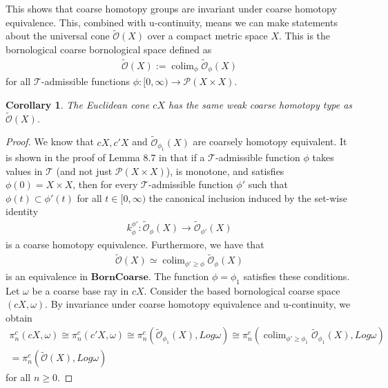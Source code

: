 \documentclass[a4paper,11pt]{article}
\theoremstyle{definition}
\theoremstyle{plain}
\newtheorem{cor}[definition]{Corollary}
\theoremstyle{remark}
\DeclareMathOperator{\colim}{colim}
\begin{document}
This shows that coarse homotopy groups are invariant under coarse homotopy equivalence. This, combined with u-continuity, means we can make statements about the universal cone $\tilde{\mathcal{O}}(X)$ over a compact metric space $X$. This is the bornological coarse bornological space defined as 
\begin{align*}
\tilde{\mathcal{O}}(X):= \colim_{\phi} \tilde{\mathcal{O}}_{\phi}(X)
\end{align*}
for all $\mathcal{T}$-admissible functions $\phi: [0,\infty) \rightarrow \mathcal{P}(X\times X)$.\\

\begin{cor} The Euclidean cone $cX$ has the same weak coarse homotopy type as $\tilde{\mathcal{O}}(X)$. 
\end{cor}

\begin{proof} We know that $cX,c'X$ and $\tilde{\mathcal{O}}_{\phi_1}(X)$ are coarsely homotopy equivalent. It is shown in the proof of Lemma $8.7$ in \cite{bunke2020coarse}  that if a $\mathcal{T}$-admissible function $\phi$ takes values in $\mathcal{T}$ (and not just $\mathcal{P}(X\times X)$), is monotone, and satisfies $\phi(0) = X \times X$, then for every $\mathcal{T}$-admissible function $\phi'$ such that $\phi(t) \subset \phi'(t)$ for all $t\in [0,\infty)$ the canonical inclusion induced by the set-wise identity 
\begin{align*}
k^{\phi'}_{\phi} : \tilde{\mathcal{O}}_{\phi}(X) \rightarrow \tilde{\mathcal{O}}_{\phi'}(X)
\end{align*}
is a coarse homotopy equivalence. Furthermore, we have that 
\begin{align*}
\tilde{\mathcal{O}}(X) \simeq \colim_{\phi'\geq \phi} \tilde{\mathcal{O}}_{\phi}(X)
\end{align*}
is an equivalence in $\mathbf{BornCoarse}$. The function $\phi=\phi_1$ satisfies these conditions.\\

Let $\omega$ be a coarse base ray in $cX$. Consider the based bornological coarse space $(cX,\omega)$. By invariance under coarse homotopy equivalence and u-continuity, we obtain 
\begin{align*}
\pi^c_{n}(cX,\omega) \cong \pi^c_{n}(c'X,\omega) \cong \pi^c_{n}(\tilde{\mathcal{O}}_{\phi_1}(X), Log\omega) \cong \pi^c_{n}(\colim_{\phi'\geq \phi_1} \tilde{\mathcal{O}}_{\phi_1}(X),Log \omega) \\
=  \pi^c_{n}(\tilde{\mathcal{O}}(X),Log\omega)
\end{align*}
for all $n\geq 0$. 
\end{proof}
\end{document}
